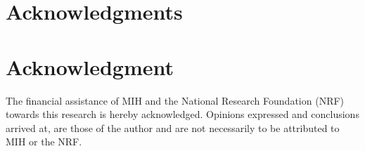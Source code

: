 \documentclass[10pt,a4paper,conference]{IEEEtran}
\begin{document}
\ifCLASSOPTIONcompsoc
  \section*{Acknowledgments}
\else
  \section*{Acknowledgment}
\fi

The financial assistance of MIH and the National Research Foundation (NRF) towards this research is hereby acknowledged. Opinions expressed and
conclusions arrived at, are those of the author and are not necessarily to be attributed to MIH or the NRF.




\end{document}
